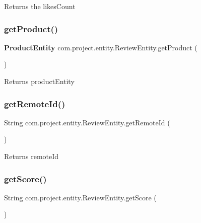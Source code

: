 \begin{DoxyReturn}{Returns}
the likes\+Count 
\end{DoxyReturn}
\mbox{\label{classcom_1_1project_1_1entity_1_1_review_entity_a3823beaab4a7d3edf9d35ebe77d8daee}} 
\subsubsection{get\+Product()}
{\footnotesize\ttfamily \textbf{ Product\+Entity} com.\+project.\+entity.\+Review\+Entity.\+get\+Product (\begin{DoxyParamCaption}{ }\end{DoxyParamCaption})}

\begin{DoxyReturn}{Returns}
product\+Entity 
\end{DoxyReturn}
\mbox{\label{classcom_1_1project_1_1entity_1_1_review_entity_afedba077d5835d7b914d4672f199a83e}} 
\subsubsection{get\+Remote\+Id()}
{\footnotesize\ttfamily String com.\+project.\+entity.\+Review\+Entity.\+get\+Remote\+Id (\begin{DoxyParamCaption}{ }\end{DoxyParamCaption})}

\begin{DoxyReturn}{Returns}
remote\+Id 
\end{DoxyReturn}
\mbox{\label{classcom_1_1project_1_1entity_1_1_review_entity_ab33fd76de384b57fbb2276683f6e1a0c}} 
\subsubsection{get\+Score()}
{\footnotesize\ttfamily String com.\+project.\+entity.\+Review\+Entity.\+get\+Score (\begin{DoxyParamCaption}{ }\end{DoxyParamCaption})}

